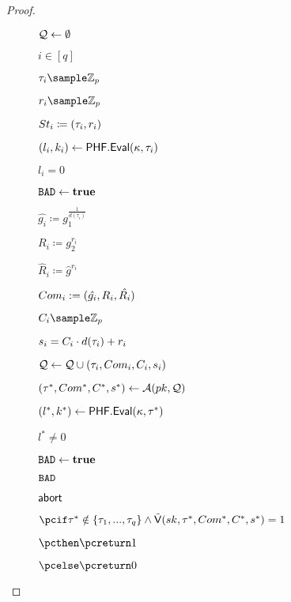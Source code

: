 \begin{proof}
\begin{figure}[htb!]
{\begin{minipage}[t]{0.7\textwidth}
\begin{nicodemus}
		\item $\mathcal{Q} \leftarrow \emptyset$
                \item \pcfor $i \in [q]$
                \item \quad $ \tau_i \sample \mathbb{Z}_p$
                \hfill{}
                \item  \quad $r_i \sample \mathbb{Z}_p$
                \item  \quad $St_i \coloneqq (\tau_i,r_i )$
                \item \quad $(l_i,k_i) \leftarrow \mathsf{PHF}.\mathsf{Eval}(\kappa,\tau_i)$
                \hfill{}
                \item \quad \pcif $l_i = 0$
                \hfill{}
                \item \quad \quad \pcthen $\texttt{BAD} \leftarrow \textbf{true}$
                \hfill{}
                \item \quad  $\hat{g_i} \coloneqq g_1^{\frac{1}{d(\tau_i)}}$
                \item \quad  $R_i \coloneqq g_2^{r_i}$
                \item  \quad $\hat{R}_i \coloneqq \hat{g}^{r_i}$
                \item  \quad $Com_i := (\hat{g_i},R_i,\hat{R_i})$
                \item \quad $ \c_i \sample \mathbb{Z}_p$
                \item \quad $s_i = C_i\cdot d(\tau_i) + r_i$
                \item \quad $\mathcal{Q} \leftarrow \mathcal{Q} \cup (\tau_i,Com_i,C_i,s_i) $
                \item $(\tau^*, Com^*,C^*,s^*)\gets\mathcal{A}(pk,\mathcal{Q})$
                 \item \quad $(l^*,k^*) \leftarrow \mathsf{PHF}.\mathsf{Eval}(\kappa,\tau^*)$
                \hfill{}
                \item \quad \pcif $l^* \neq 0$
                \hfill{}
                \item \quad \quad \pcthen $\texttt{BAD} \leftarrow \textbf{true}$
                \hfill{}
        
                \item \quad \pcif $\texttt{BAD}$
                \hfill{}
                \item \quad \quad \pcthen $\mathsf{abort}$
                \hfill{}

                \item $\pcif \tau^* \notin \{\tau_1,...,\tau_q\} \land \IDAltV(\sk, \tau^*, \com^*,\c^*,\s^*) = 1$
                \item $\pcthen \pcreturn 1$
                \item $\pcelse \pcreturn 0$


\end{nicodemus}
\end{minipage}}
\end{figure}
\end{proof}
